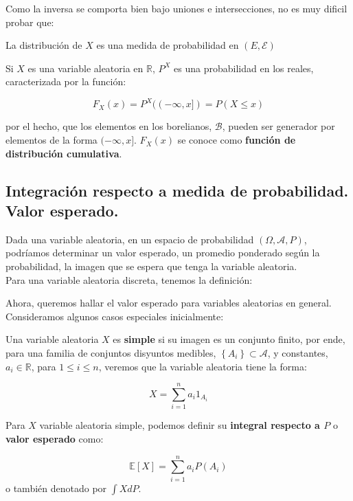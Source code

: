 	Como la inversa se comporta bien bajo uniones e intersecciones, no es muy dificil probar que:

\begin{theorem}
	La distribución de $X$ es una medida de probabilidad en $(E, \mathcal{E})$
\end{theorem}

	Si $X$ es una variable aleatoria en $\mathbb{R}$, $P^{X}$ es una probabilidad en los reales, caracterizada por la función:

	\[
		F_X (x) = P^{X} ( (-\infty, x] ) = P(X \leq x)
	\]

	por el hecho, que los elementos en los borelianos, $\mathcal{B}$, pueden ser generador por elementos de la forma $(-\infty, x]$. $F_X (x)$ se conoce como \textbf{función de distribución cumulativa}.






















\subsection{Integración respecto a medida de probabilidad. Valor esperado.}

Dada una variable aleatoria, en un espacio de probabilidad $(\Omega, \mathcal{A}, P)$, podríamos determinar un valor esperado, un promedio ponderado según la probabilidad, la imagen que se espera que tenga la variable aleatoria. \\

Para una variable aleatoria discreta, tenemos la definición:


Ahora, queremos hallar el valor esperado para variables aleatorias en general. Consideramos algunos casos especiales inicialmente:

\begin{boxDef}
	Una variable aleatoria $X$ es \textbf{simple} si su imagen es un conjunto finito, por ende, para una familia de conjuntos disyuntos medibles, $ \left\{ A_i  \right\} \subset \mathcal{A}$, y constantes, $a_i \in \mathbb{R}$, para $1 \leq i \leq n$, veremos que la variable aleatoria tiene la forma:

	\[
		X = \sum_{i = 1}^n a_i 1_{A_i}
	\]

	Para $X$ variable aleatoria simple, podemos definir su \textbf{integral respecto a $P$} o \textbf{valor esperado} como:

	\[
		\mathbb{E}[X] = \sum_{i = 1}^n a_i P(A_i)
	\]
	o también denotado por $\int X dP$.

\end{boxDef}

